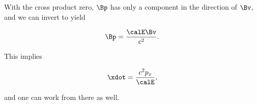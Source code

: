 {With the cross product zero, \(\Bp\) has only a component in the direction of \(\Bv\), and we can invert to yield

\begin{equation}\label{eqn:relativisticElectrodynamicsT3:180}
\Bp = \frac{\calE \Bv}{c^2}.
\end{equation}

This implies

\begin{equation}\label{eqn:relativisticElectrodynamicsT3:200}
\xdot = \frac{c^2 p_x}{\calE},
\end{equation}

and one can work from there as well.

} %
